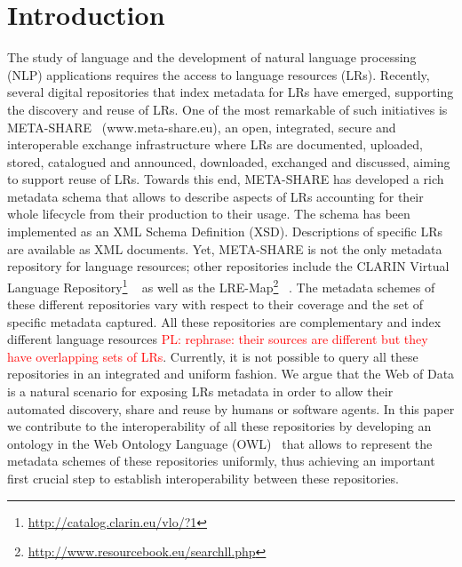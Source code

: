 \documentclass{llncs}
\begin{document}
\section{Introduction}
\label{sec:introduction}
The study of language and the development of natural language processing (NLP) applications requires the access to language resources (LRs). %
Recently, several digital repositories that index metadata for LRs have emerged, supporting the discovery and reuse of LRs. One of the most remarkable of such initiatives is META-SHARE~\cite{piperidis2012meta} (www.meta-share.eu), an open, integrated, secure and interoperable exchange infrastructure where LRs are documented, uploaded, stored, catalogued and announced, downloaded, exchanged and discussed, aiming to support reuse of LRs. Towards this end, META-SHARE has developed a rich metadata schema that allows to describe aspects of LRs accounting for their whole lifecycle from their production to their usage. The schema has been implemented as an XML Schema Definition (XSD). Descriptions of specific LRs are available as XML documents.
Yet, META-SHARE is not the only metadata repository for language resources; other repositories include the CLARIN Virtual Language Repository\footnote{\url{http://catalog.clarin.eu/vlo/?1}} ~\cite{broeder2010data} as well as the LRE-Map\footnote{\url{http://www.resourcebook.eu/searchll.php}} ~\cite{calzolari2012lre}. The metadata schemes of these different repositories vary with respect to their coverage and the set of specific metadata captured.
All these repositories are complementary and index different language resources \textcolor{red}{PL: rephrase: their sources are different but they have overlapping sets of LRs}. Currently, it is not possible to query all these repositories in an integrated and uniform fashion.
We argue that the Web of Data is a natural scenario for exposing LRs metadata in order to allow their automated discovery, share and reuse by humans or software agents. %
In this paper we contribute to the interoperability of all these repositories by developing an ontology in the Web Ontology Language (OWL)~\cite{motik2012owl} that allows to represent the metadata schemes of these repositories uniformly, thus achieving an important first crucial step to establish interoperability between these repositories.
\end{document}
